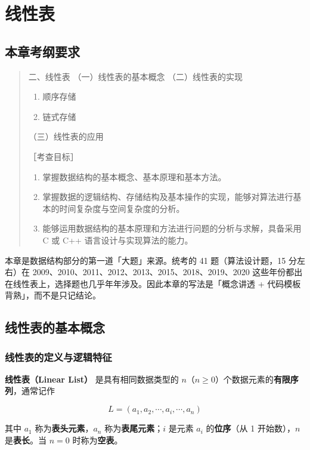 \documentclass[11pt,openany,UTF8]{ctexbook}
\begin{document}
\chapter{线性表}
\section*{本章考纲要求}

\begin{quote}
二、线性表 （一）线性表的基本概念 （二）线性表的实现

\begin{enumerate}
\item 顺序存储
\item 链式存储
\end{enumerate}
（三）线性表的应用

［考查目标］

\begin{enumerate}
\item 掌握数据结构的基本概念、基本原理和基本方法。
\item 掌握数据的逻辑结构、存储结构及基本操作的实现，能够对算法进行基本的时间复杂度与空间复杂度的分析。
\item 能够运用数据结构的基本原理和方法进行问题的分析与求解，具备采用 C 或 C++ 语言设计与实现算法的能力。
\end{enumerate}
\end{quote}
本章是数据结构部分的第一道「大题」来源。统考的 41 题（算法设计题，15 分左右）在 2009、2010、2011、2012、2013、2015、2018、2019、2020 这些年份都出在线性表上，选择题也几乎年年涉及。因此本章的写法是「概念讲透 + 代码模板背熟」，而不是只记结论。

\section{线性表的基本概念}

\subsection{线性表的定义与逻辑特征}

\textbf{线性表（Linear List）} 是具有相同数据类型的 $n$（$n \ge 0$）个数据元素的\textbf{有限序列}，通常记作

\[L = (a_1, a_2, \cdots, a_i, \cdots, a_n)\]

其中 $a_1$ 称为\textbf{表头元素}，$a_n$ 称为\textbf{表尾元素}；$i$ 是元素 $a_i$ 的\textbf{位序}（从 1 开始数），$n$ 是\textbf{表长}。当 $n=0$ 时称为\textbf{空表}。
\end{document}
